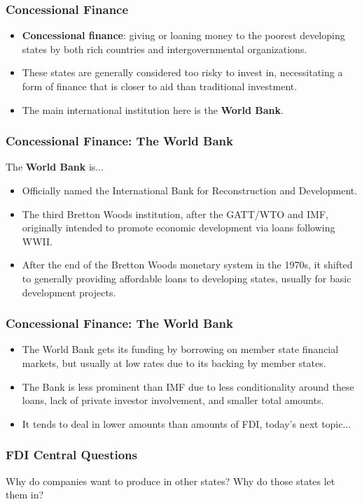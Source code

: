 \documentclass{beamer}
\begin{document}
\begin{frame} 
	\frametitle{\LARGE{Concessional Finance}}
	\begin{itemize}
		\item \textbf{Concessional finance}: giving or loaning money to the poorest developing states by both rich countries and intergovernmental organizations. \pause
		\item These states are generally considered too risky to invest in, necessitating a form of finance that is closer to aid than traditional investment. \pause
		\item The main international institution here is the \textbf{World Bank}. 	
	\end{itemize}
\end{frame}

\begin{frame} 
	\frametitle{\LARGE{Concessional Finance}: The World Bank}
	The \textbf{World Bank} is...
	\begin{itemize}
		\item Officially named the International Bank for Reconstruction and Development. \pause
		\item The third Bretton Woods institution, after the GATT/WTO and IMF, originally intended to promote economic development via loans following WWII. 
		\item After the end of the Bretton Woods monetary system in the 1970s, it shifted to generally providing affordable loans to developing states, usually for basic development projects. 
	\end{itemize}
\end{frame}

\begin{frame} 
	\frametitle{\LARGE{Concessional Finance}: The World Bank}
	\begin{itemize}
		\item The World Bank gets its funding by borrowing on member state financial markets, but usually at low rates due to its backing by member states. \pause
		\item The Bank is less prominent than IMF due to less conditionality around these loans, lack of private investor involvement, and smaller total amounts.
		\item It tends to deal in lower amounts than amounts of FDI, today's next topic...
	\end{itemize}
\end{frame}

\begin{frame} 
	\frametitle{\LARGE{FDI Central Questions}}
	\centering 
	\Large{Why do companies want to produce in other states? Why do those states let them in?}
\end{frame}
\end{document}

